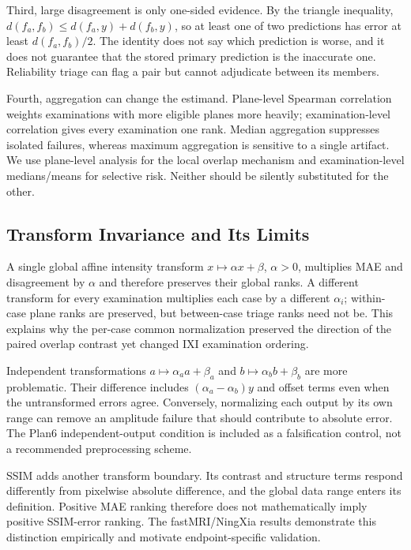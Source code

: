 \documentclass[journal,10pt]{IEEEtran}
\begin{document}
Third, large disagreement is only one-sided evidence. By the triangle inequality, $d(f_a,f_b)\le d(f_a,y)+d(f_b,y)$, so at least one of two predictions has error at least $d(f_a,f_b)/2$. The identity does not say which prediction is worse, and it does not guarantee that the stored primary prediction is the inaccurate one. Reliability triage can flag a pair but cannot adjudicate between its members.

Fourth, aggregation can change the estimand. Plane-level Spearman correlation weights examinations with more eligible planes more heavily; examination-level correlation gives every examination one rank. Median aggregation suppresses isolated failures, whereas maximum aggregation is sensitive to a single artifact. We use plane-level analysis for the local overlap mechanism and examination-level medians/means for selective risk. Neither should be silently substituted for the other.

\subsection{Transform Invariance and Its Limits}
A single global affine intensity transform $x\mapsto \alpha x+\beta$, $\alpha>0$, multiplies MAE and disagreement by $\alpha$ and therefore preserves their global ranks. A different transform for every examination multiplies each case by a different $\alpha_i$; within-case plane ranks are preserved, but between-case triage ranks need not be. This explains why the per-case common normalization preserved the direction of the paired overlap contrast yet changed IXI examination ordering.

Independent transformations $a\mapsto\alpha_a a+\beta_a$ and $b\mapsto\alpha_b b+\beta_b$ are more problematic. Their difference includes $(\alpha_a-\alpha_b)y$ and offset terms even when the untransformed errors agree. Conversely, normalizing each output by its own range can remove an amplitude failure that should contribute to absolute error. The Plan6 independent-output condition is included as a falsification control, not a recommended preprocessing scheme.

SSIM adds another transform boundary. Its contrast and structure terms respond differently from pixelwise absolute difference, and the global data range enters its definition. Positive MAE ranking therefore does not mathematically imply positive SSIM-error ranking. The fastMRI/NingXia results demonstrate this distinction empirically and motivate endpoint-specific validation.
\end{document}
